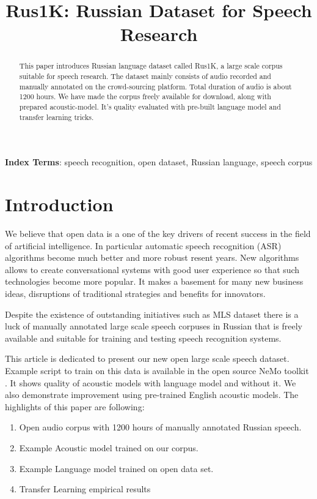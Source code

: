 \documentclass[a4paper]{article}
\title{Rus1K: Russian Dataset for Speech Research}
\begin{document}
\maketitle
% 
\begin{abstract}
 
  This paper introduces Russian language dataset called Rus1K, a large scale corpus suitable for speech research. The dataset mainly consists of audio recorded and manually annotated on the crowd-sourcing platform. Total duration of audio is about 1200 hours. We have made the corpus freely available for download, along with prepared acoustic-model. It's quality evaluated with pre-built language model and transfer learning tricks. 
  
  
\end{abstract}
\noindent\textbf{Index Terms}: speech recognition, open dataset, Russian language, speech corpus

\section{Introduction}
 We believe that open data is a one of the key drivers of recent success in the field of artificial intelligence. In particular automatic speech recognition (ASR) algorithms become much better and more robust resent years. New algorithms allows to create conversational systems with good user experience so that such technologies become more popular. It makes a basement for many new business ideas, disruptions of traditional strategies and benefits for innovators.
  
 Despite the existence of outstanding initiatives such as MLS dataset \cite{pratap2020mls} there is a luck of manually annotated large scale speech corpuses in Russian that is freely available and suitable for training and testing speech recognition systems.
 
 This article is dedicated to present our new open large scale speech dataset. Example script to train on this data is available in the open source NeMo toolkit \cite{kuchaiev2019nemo}. It shows quality of acoustic models with language model and without it. We also demonstrate improvement using pre-trained English acoustic models. The highlights of this paper are following:
\begin{enumerate}
\item Open audio corpus with 1200 hours of manually annotated Russian speech.
\item Example Acoustic model trained on our corpus.
\item Example Language model trained on open data set.
\item Transfer Learning empirical results
\end{enumerate}
\end{document}
